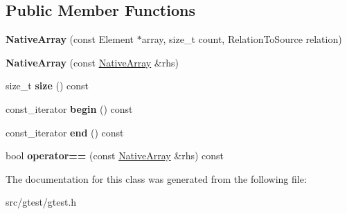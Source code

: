 \subsection*{Public Member Functions}
\begin{DoxyCompactItemize}
\item 
\mbox{\label{classtesting_1_1internal_1_1_native_array_a568de999aca0fc0c2cc574fac2405872}} 
{\bfseries Native\+Array} (const Element $\ast$array, size\+\_\+t count, Relation\+To\+Source relation)
\item 
\mbox{\label{classtesting_1_1internal_1_1_native_array_abb346ac3040f5da733f594cc2d5958bc}} 
{\bfseries Native\+Array} (const \mbox{\hyperlink{classtesting_1_1internal_1_1_native_array}{Native\+Array}} \&rhs)
\item 
\mbox{\label{classtesting_1_1internal_1_1_native_array_af96a4a5ca0cdd5d163c47a081f08bd89}} 
size\+\_\+t {\bfseries size} () const
\item 
\mbox{\label{classtesting_1_1internal_1_1_native_array_a3046d93cfa23097e7b7c91f5f982dc78}} 
const\+\_\+iterator {\bfseries begin} () const
\item 
\mbox{\label{classtesting_1_1internal_1_1_native_array_ae1cda748e49c6906421c6183c4d07c5a}} 
const\+\_\+iterator {\bfseries end} () const
\item 
\mbox{\label{classtesting_1_1internal_1_1_native_array_a81b90f5739ed812610e68dc34c9e3850}} 
bool {\bfseries operator==} (const \mbox{\hyperlink{classtesting_1_1internal_1_1_native_array}{Native\+Array}} \&rhs) const
\end{DoxyCompactItemize}


The documentation for this class was generated from the following file\+:\begin{DoxyCompactItemize}
\item 
src/gtest/gtest.\+h\end{DoxyCompactItemize}
